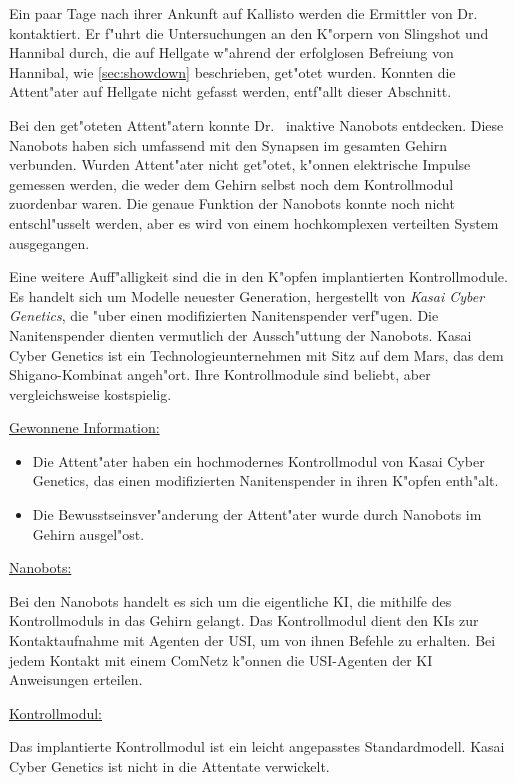 
Ein paar Tage nach ihrer Ankunft auf Kallisto werden die Ermittler von Dr.~  kontaktiert. Er f"uhrt die Untersuchungen an den K"orpern von Slingshot und Hannibal durch, die auf Hellgate w"ahrend der erfolglosen Befreiung von Hannibal, wie \cref{sec:showdown} beschrieben, get"otet wurden. Konnten die Attent"ater auf Hellgate nicht gefasst werden, entf"allt dieser Abschnitt.

Bei den get"oteten Attent"atern konnte Dr.~  inaktive Nanobots entdecken. Diese Nanobots haben sich umfassend mit den Synapsen im gesamten Gehirn verbunden. Wurden Attent"ater nicht get"otet, k"onnen elektrische Impulse gemessen werden, die weder dem Gehirn selbst noch dem Kontrollmodul zuordenbar waren. Die genaue Funktion der Nanobots konnte noch nicht entschl"usselt werden, aber es wird von einem hochkomplexen verteilten System ausgegangen.

Eine weitere Auff"alligkeit sind die in den K"opfen implantierten Kontrollmodule. Es handelt sich um Modelle neuester Generation, hergestellt von \emph{Kasai Cyber Genetics}, die "uber einen modifizierten Nanitenspender verf"ugen. Die Nanitenspender dienten vermutlich der Aussch"uttung der Nanobots. Kasai Cyber Genetics ist ein Technologieunternehmen mit Sitz auf dem Mars, das dem Shigano-Kombinat angeh"ort. Ihre Kontrollmodule sind beliebt, aber vergleichsweise kostspielig.

\begin{remarks}
	\underline{Gewonnene Information:}
	
	\begin{itemize}
		\item Die Attent"ater haben ein hochmodernes Kontrollmodul von Kasai Cyber Genetics, das einen modifizierten Nanitenspender in ihren 
			K"opfen enth"alt.
		\item Die Bewusstseinsver"anderung der Attent"ater wurde durch Nanobots im Gehirn ausgel"ost.
	\end{itemize}
	
	\underline{Nanobots:}

	Bei den Nanobots handelt es sich um die eigentliche KI, die mithilfe des Kontrollmoduls in das Gehirn gelangt. Das Kontrollmodul dient den KIs zur Kontaktaufnahme mit Agenten der USI, um von ihnen Befehle zu erhalten. Bei jedem Kontakt mit einem ComNetz k"onnen die USI-Agenten der KI Anweisungen erteilen.

	\underline{Kontrollmodul:}

	Das implantierte Kontrollmodul ist ein leicht angepasstes Standardmodell. Kasai Cyber Genetics ist nicht in die Attentate verwickelt.
\end{remarks}
\vfill
